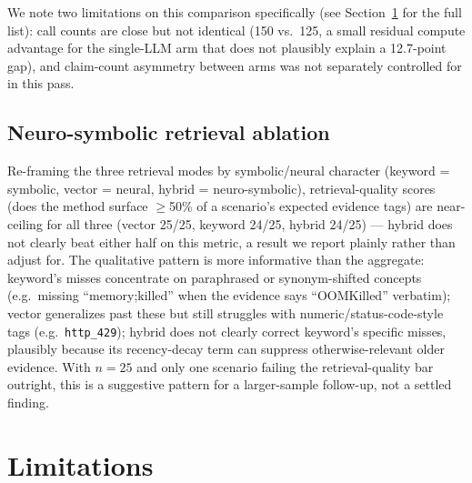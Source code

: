 \documentclass{article}
\begin{document}
We note two limitations on this comparison specifically (see
Section~\ref{sec:limitations} for the full list): call counts are close
but not identical (150 vs.\ 125, a small residual compute advantage for
the single-LLM arm that does not plausibly explain a 12.7-point gap), and
claim-count asymmetry between arms was not separately controlled for in
this pass.

\subsection{Neuro-symbolic retrieval ablation}
\label{sec:results-neurosymbolic}

Re-framing the three retrieval modes by symbolic/neural character
(keyword = symbolic, vector = neural, hybrid = neuro-symbolic),
retrieval-quality scores (does the method surface $\geq$50\% of a
scenario's expected evidence tags) are near-ceiling for all three (vector
25/25, keyword 24/25, hybrid 24/25) --- hybrid does not clearly beat
either half on this metric, a result we report plainly rather than adjust
for. The qualitative pattern is more informative than the aggregate:
keyword's misses concentrate on paraphrased or synonym-shifted concepts
(e.g.\ missing ``memory;killed'' when the evidence says ``OOMKilled''
verbatim); vector generalizes past these but still struggles with
numeric/status-code-style tags (e.g.\ \texttt{http\_429}); hybrid does not
clearly correct keyword's specific misses, plausibly because its
recency-decay term can suppress otherwise-relevant older evidence. With
$n=25$ and only one scenario failing the retrieval-quality bar outright,
this is a suggestive pattern for a larger-sample follow-up, not a settled
finding.

\section{Limitations}
\label{sec:limitations}
\end{document}
